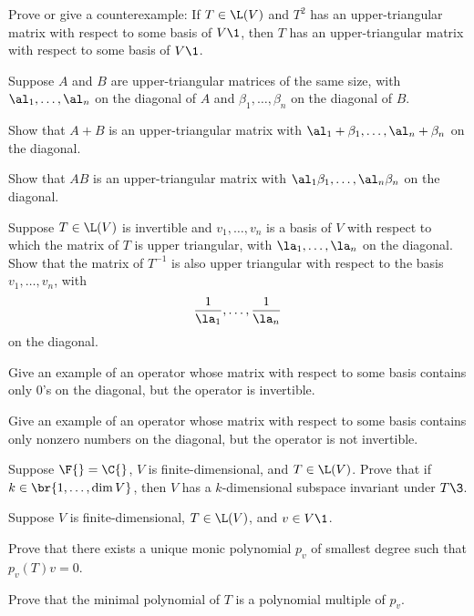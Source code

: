 
\exercise
Prove or give a counterexample: If $T \in \L(V)$ and $T^2$ has an upper-triangular matrix with respect to some basis of $V\1$, then $T$ has an upper-triangular matrix with respect to some basis of $V\1$.


\exercise
Suppose $A$ and $B$ are upper-triangular matrices of the same size, with $\al_1, \ldots, \al_n$ on the diagonal of $A$ and
$\beta_1, \ldots, \beta_n$ on the diagonal of $B$.\label{2AB}
\begin{subtheorem}
\item
Show that $A+B$ is an upper-triangular matrix with $\al_1 + \beta _1, \ldots, \al_n + \beta_n$ on the diagonal.
\item
Show that $AB$ is an upper-triangular matrix with $\al_1 \beta _1, \ldots, \al_n \beta_n$ on the diagonal.
\end{subtheorem}


\exercise
Suppose $T \in \L(V)$ is invertible and $v_1, \dots, v_n$ is a basis of $V$ with respect to which the matrix of $T$ is upper triangular, with $\la_1, \ldots, \la_n$ on the diagonal.
Show that the matrix of $T^{-1}$ is also upper triangular with respect to the basis $v_1, \dots, v_n$, with
\[
\frac{1}{\la_1}, \ldots, \frac{1}{\la_n}
\]
on the diagonal.


\exercise
Give an example of an operator whose matrix with respect to some basis contains only $0$'s on the diagonal, but the operator is invertible.


\exercise
Give an example of an operator whose matrix with respect to some basis contains
only nonzero numbers on the diagonal, but the operator is not invertible.


\exercise
Suppose $\F{} = \C{}$, $V$ is finite-dimensional, and $T \in \L(V)$. Prove that if $k \in \br{1, \dots, \dim V}$,
then $V$ has a $k$-dimensional subspace invariant under $T\3$. \label{457}


\exercise
Suppose $V$ is finite-dimensional, $T \in \L(V)$, and $v \in V\1$. \label{2minpolyv}
\begin{subtheorem}
\item
Prove that there exists a unique monic polynomial $p_v$ of smallest degree such that $p_v(T)v = 0$.
\item
Prove that the minimal polynomial of $T$ is a polynomial multiple of $p_v$.
\end{subtheorem}
\exercisesubtheoremend


